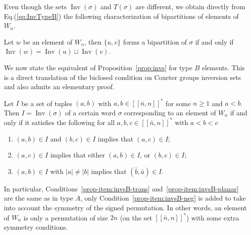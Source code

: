 \documentclass[ALCO,Unicode]{cedram}
\theoremstyle{definition}
\DeclareMathOperator{\invs}{Inv}
\newcommand{\Bsetnn}{[\![\bar{n},n ]\!]^*}
\begin{document}
Even though the sets $\invs(\sigma)$ and $T(\sigma)$ are different, we obtain directly from Eq.(\ref{eq:InvTypeB}) the following characterization of bipartitions of elements of $W_n$.

\begin{lemm}
\label{lem:B-invsT}
Let $w$ be an element of $W_n$, then $\lbrace u, v \rbrace$ forms a bipartition of $\sigma$ if and only if $\invs(w) = \invs(u)  \sqcup \invs(v)$.
\end{lemm}


We now state the equivalent of Proposition~\ref{prop:invs} for type $B$ elements. This is a direct translation of the biclosed condition on Coxeter groups inversion sets and also admits an elementary proof.

\begin{prop}
\label{prop:invsB}
Let $I$ be a set of tuples $(a,b)$ with $a,b \in \Bsetnn$ for some $n \geq 1$ and $a < b$. Then $I = \invs(\sigma)$ of a certain word $\sigma$ corresponding to an element of $W_n$ if and only if it satisfies the following for all $a,b,c \in \Bsetnn$ with $a < b < c$

\begin{enumerate}
\item $(a,b) \in I$ and $(b,c) \in I$ implies that $(a,c) \in I$;
\label{prop-item:invsB-trans}
\item $(a,c) \in I$ implies that either $(a,b) \in I$, or $(b,c) \in I$;
\label{prop-item:invsB-planar}
\item $(a,b) \in I$ with $|a| \neq |b|$ implies that $(\bar b,  \bar a) \in I$.
\label{prop-item:invsB-neg}
\end{enumerate}
\end{prop}

In particular, Conditions~\eqref{prop-item:invsB-trans} and~\eqref{prop-item:invsB-planar} are the same as in type $A$, only Condition~\eqref{prop-item:invsB-neg} is added to take into account the symmetry of the signed permutation. In other words, an element of $W_n$ is only a permutation of size $2n$ (on the set $\Bsetnn$) with some extra symmetry conditions. 
\end{document}
